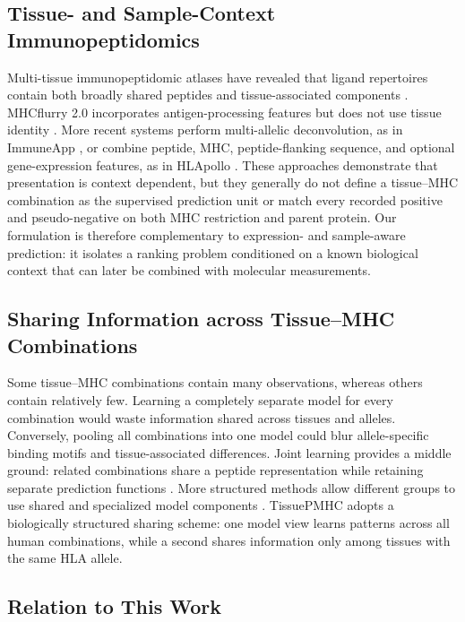 \subsection{Tissue- and Sample-Context Immunopeptidomics}

Multi-tissue immunopeptidomic atlases have revealed that ligand repertoires contain both broadly shared peptides and tissue-associated components \cite{marcu2021atlas,schuster2018mouse}. MHCflurry 2.0 incorporates antigen-processing features but does not use tissue identity \cite{odonnell2020mhcflurry}. More recent systems perform multi-allelic deconvolution, as in ImmuneApp \cite{xu2024immuneapp}, or combine peptide, MHC, peptide-flanking sequence, and optional gene-expression features, as in HLApollo \cite{thrift2024hlapollo}. These approaches demonstrate that presentation is context dependent, but they generally do not define a tissue--MHC combination as the supervised prediction unit or match every recorded positive and pseudo-negative on both MHC restriction and parent protein. Our formulation is therefore complementary to expression- and sample-aware prediction: it isolates a ranking problem conditioned on a known biological context that can later be combined with molecular measurements.

\subsection{Sharing Information across Tissue--MHC Combinations}

Some tissue--MHC combinations contain many observations, whereas others contain relatively few. Learning a completely separate model for every combination would waste information shared across tissues and alleles. Conversely, pooling all combinations into one model could blur allele-specific binding motifs and tissue-associated differences. Joint learning provides a middle ground: related combinations share a peptide representation while retaining separate prediction functions \cite{caruana1997multitask,ruder2017overview}. More structured methods allow different groups to use shared and specialized model components \cite{ma2018mmoe,tang2020ple}. TissuePMHC adopts a biologically structured sharing scheme: one model view learns patterns across all human combinations, while a second shares information only among tissues with the same HLA allele.

\subsection{Relation to This Work}

